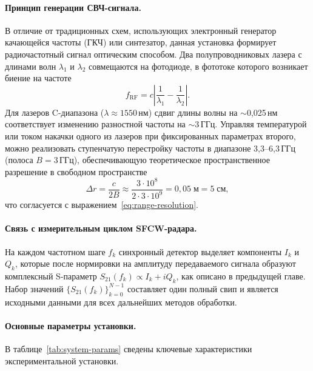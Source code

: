 \paragraph{Принцип генерации СВЧ-сигнала.}
В отличие от традиционных схем, использующих электронный генератор
качающейся частоты (ГКЧ) или синтезатор, данная установка формирует
радиочастотный сигнал оптическим способом. Два полупроводниковых лазера с
длинами волн $\lambda_1$ и $\lambda_2$ совмещаются на фотодиоде, в фототоке
которого возникает биение на частоте
\begin{equation}
    f_{\mathrm{RF}} = c\left|\frac{1}{\lambda_1} - \frac{1}{\lambda_2}\right|.
    \label{eq:beat-freq}
\end{equation}
Для лазеров C-диапазона ($\lambda \approx 1550$\,нм) сдвиг длины волны на
$\sim$0{,}025\,нм соответствует изменению разностной частоты на $\sim$3\,ГГц.
Управляя температурой или током накачки одного из лазеров при фиксированных
параметрах второго, можно реализовать ступенчатую перестройку частоты в
диапазоне 3{,}3--6{,}3\,ГГц (полоса $B = 3$\,ГГц), обеспечивающую
теоретическое пространственное разрешение в свободном пространстве
\begin{equation}
    \Delta r = \frac{c}{2 B} \approx
    \frac{3 \cdot 10^8}{2 \cdot 3 \cdot 10^9} = 0{,}05\;\text{м} = 5\;\text{см},
\end{equation}
что согласуется с выражением~\eqref{eq:range-resolution}.

\paragraph{Связь с измерительным циклом SFCW-радара.}
На каждом частотном шаге $f_k$ синхронный детектор выделяет компоненты $I_k$
и $Q_k$, которые после нормировки на амплитуду передаваемого сигнала образуют
комплексный S-параметр $S_{21}(f_k) \propto I_k + iQ_k$, как описано в
предыдущей главе. Набор значений $\{S_{21}(f_k)\}_{k=0}^{N-1}$ составляет
один полный свип и является исходными данными для всех дальнейших методов
обработки.

\paragraph{Основные параметры установки.}
В таблице~\ref{tab:system-params} сведены ключевые характеристики
экспериментальной установки.

